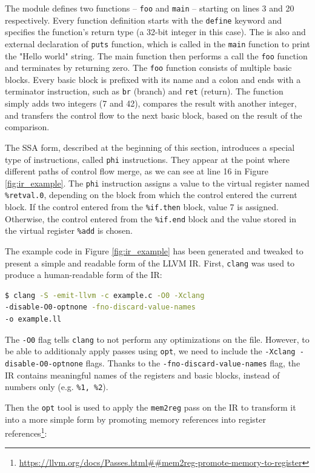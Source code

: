\documentclass[
  digital, %
  table,   %
  twoside, %
  nolof,     %
  nolot,     %
]{fithesis3}
\theoremstyle{definition}
\begin{document}
The module defines two functions -- \texttt{foo} and \texttt{main} -- starting on lines 3 and 20 respectively. Every function definition starts with the \texttt{define} keyword and specifies the function's return type (a 32-bit integer in this case). The is also and external declaration of \texttt{puts} function, which is called in the \texttt{main} function to print the "Hello world" string. The main function then performs a call the \texttt{foo} function and terminates by returning zero. The \texttt{foo} function consists of multiple basic blocks. Every basic block is prefixed with its name and a colon and ends with a terminator instruction, such as \texttt{br} (branch) and \texttt{ret} (return). The function simply adds two integers (7 and 42), compares the result with another integer, and transfers the control flow to the next basic block, based on the result of the comparison. 

The SSA form, described at the beginning of this section, introduces a special type of instructions, called \texttt{phi} instructions. They appear at the point where different paths of control flow merge, as we can see at line 16 in Figure \ref{fig:ir_example}. The \texttt{phi} instruction assigns a value to the virtual register named \texttt{\%retval.0}, depending on the block from which the control entered the current block. If the control entered from the \texttt{\%if.then} block, value 7 is assigned. Otherwise, the control entered from the \texttt{\%if.end} block and the value stored in the virtual register \texttt{\%add} is chosen. 

The example code in Figure \ref{fig:ir_example} has been generated and tweaked to present a simple and readable form of the LLVM IR. First, \texttt{clang} was used to produce a human-readable form of the IR:

\begin{lstlisting}[language=bash]
$ clang -S -emit-llvm -c example.c -O0 -Xclang  
-disable-O0-optnone -fno-discard-value-names 
-o example.ll
\end{lstlisting}

The \texttt{-O0} flag tells \texttt{clang} to not perform any optimizations on the file. However, to be able to additionaly apply passes using \texttt{opt}, we need to include the \texttt{-Xclang -disable-O0-optnone} flags. Thanks to the \texttt{-fno-discard-value-names} flag, the IR contains meaningful names of the registers and basic blocks, instead of numbers only (e.g. \texttt{\%1, \%2}).

Then the \texttt{opt} tool is used to apply the \texttt{mem2reg} pass on the IR to transform it into a more simple form by promoting memory references into register references\footnote{\url{https://llvm.org/docs/Passes.html##mem2reg-promote-memory-to-register}}:
\end{document}
